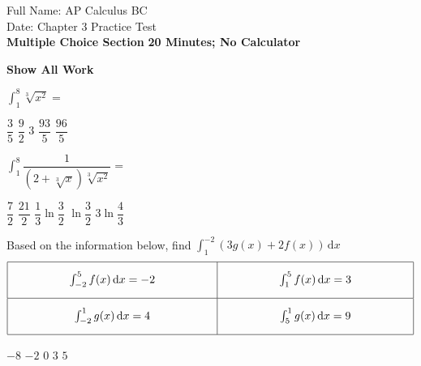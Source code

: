\pagecolor{gray!10}%
Full Name: \hfill AP Calculus BC \\[22pt]
Date: \hfill Chapter 3 Practice Test \\[22pt]
\textbf{Multiple Choice Section} \hfill \textbf{20 Minutes; No Calculator} \\[11pt]

\begin{center}
    \textbf{Show All Work}
\end{center} \vspace{11pt}

\begin{questions}
    \question $\int_1^8 \sqrt[3]{x^2} = $ \\

    \begin{oneparchoices}
        \choice $\dfrac{3}{5}$
        \choice $\dfrac{9}{2}$
        \choice $3$
        \choice $\dfrac{93}{5}$
        \choice $\dfrac{96}{5}$
    \end{oneparchoices} \par \horizontalline

    \question $\int_1^8 \dfrac{1}{\left(2 + \sqrt[3]{x}\right)\sqrt[3]{x^2}} = $ \\

    \begin{oneparchoices}
        \choice $\dfrac{7}{2}$
        \choice $\dfrac{21}{2}$
        \choice $\dfrac{1}{3}\ln\dfrac{3}{2}$
        \choice $\ln\dfrac{3}{2}$
        \choice $3\ln\dfrac{4}{3}$
    \end{oneparchoices} \par \horizontalline

    \question Based on the information below, find $\int_1^{-2} (3g(x) + 2f(x)) \,\mathrm{d}x$ \begin{align*}
        \arraycolsep=55pt\def\arraystretch{2.2} 
        \begin{array}[c]{|c|c|}
            \hline
            \int_{-2}^5 f(x) \,\mathrm{d}x = -2 & \int_1^5 f(x) \,\mathrm{d}x = 3 \\[5.5pt] \hline
            \int_{-2}^1 g(x) \,\mathrm{d}x = 4 & \int_5^1 g(x) \,\mathrm{d}x = 9 \\[5.5pt] 
            \hline
        \end{array}
    \end{align*}

    \begin{oneparchoices}
        \choice $-8$
        \choice $-2$
        \choice $0$
        \choice $3$
        \choice $5$
    \end{oneparchoices} \par \horizontalline


\end{questions}
